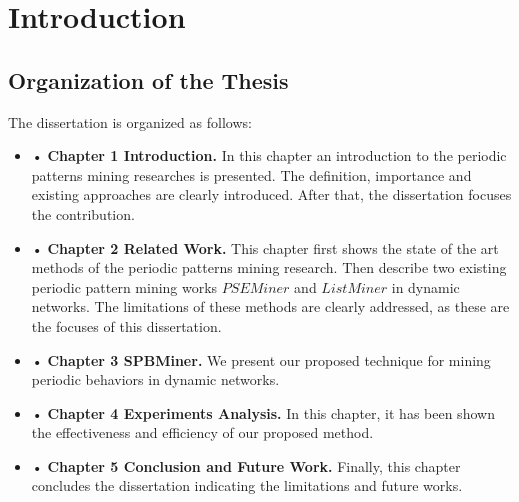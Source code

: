 \chapter{Introduction}
\label{Ch_Chapter1}



\section{Organization of the Thesis}
%
The dissertation is organized as follows: 

\begin{itemize}

\item {•} \textbf{Chapter 1 Introduction.} In this chapter an introduction to the periodic patterns mining researches is presented. The definition, importance and existing approaches are clearly introduced. After that, the dissertation focuses the contribution. 

\item {•} \textbf{Chapter 2 Related Work.} This chapter first shows the state of the art methods of the periodic patterns mining research. Then describe two existing periodic pattern mining works $PSEMiner$ and $ListMiner$ in dynamic networks. The limitations of these methods are clearly addressed, as these are the focuses of this dissertation. 

\item {•} \textbf{Chapter 3 SPBMiner.} We present our proposed technique for mining periodic behaviors in dynamic networks.  

\item {•} \textbf{Chapter 4 Experiments Analysis.} In this chapter, it has been shown the effectiveness and efficiency of our proposed method.

\item {•} \textbf{Chapter 5 Conclusion and Future Work.} Finally, this chapter concludes the dissertation indicating the limitations and future works.
\end{itemize} 
%
